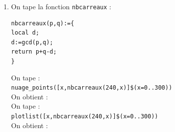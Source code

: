 \documentclass[a4paper,11pt]{book}
\begin{document}
\begin{enumerate}
temps, c'est \`a dire si elle contient $r+2$ points \`a coordonn\'ees 
enti\`eres (+2 en comptant le point de d\'epart et le point d'arriv\`ee) le 
nommbre de carreaux travers\'es est $p+q-1-r$.\\ 
Que vaut $r$ ?\\
La diagonale a comme \'equation $y=q*x/p =q1*x/p1$ o\`u $p=p1*d$ et $q=q1*d$ 
avec $d=$pgcd($p,q$) et elle aura des points \`a coordonn\'ees enti\`eres 
chaque fois que $x$ est entier et que $p1$ divise $q1*x$. Puisque $p1$ et $q1$ 
sont premiers entre eux, $p1$ divise $q1*x$ si $x$ est un entier multiple de $p1$. Cela se produit lorsque $0\geq x\geq p$,
pour $x=0,x=p1,x=2*p1...x=d*p1=p$, soit $d+1$ fois.\\
On a donc $r+2=d+1$ et le 
nommbre de carreaux travers\'es est $p+q-$pgcd$(p,q)$.\\ 
 \item On tape la fonction {\tt nbcarreaux} :
\begin{verbatim}
nbcarreaux(p,q):={
local d;
d:=gcd(p,q);
return p+q-d;
}
\end{verbatim}
On tape :\\
{\tt nuage\_points([x,nbcarreaux(240,x)]\$(x=0..300))}\\
On obtient :\\
On tape :\\
{\tt plotlist([x,nbcarreaux(240,x)]\$(x=0..300))}\\
On obtient :\\
\end{enumerate}
\end{document}
